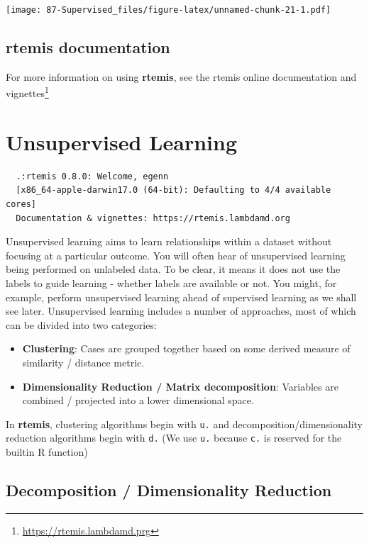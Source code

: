 \documentclass[
]{book}
\providecommand{\tightlist}{%
  \setlength{\itemsep}{0pt}\setlength{\parskip}{0pt}}
\renewcommand{\href}[2]{#2\footnote{\url{#1}}}
\begin{document}
\texttt{[image: 87-Supervised\_files/figure-latex/unnamed-chunk-21-1.pdf]}

\hypertarget{rtemis-documentation}{%
\section{\texorpdfstring{\textbf{rtemis} documentation}{rtemis documentation}}\label{rtemis-documentation}}

For more information on using \textbf{rtemis}, see the \href{https://rtemis.lambdamd.prg}{rtemis online documentation and vignettes}

\hypertarget{unsupervised}{%
\chapter{Unsupervised Learning}\label{unsupervised}}

\begin{verbatim}
  .:rtemis 0.8.0: Welcome, egenn
  [x86_64-apple-darwin17.0 (64-bit): Defaulting to 4/4 available cores]
  Documentation & vignettes: https://rtemis.lambdamd.org
\end{verbatim}

Unsupervised learning aims to learn relationships within a dataset without focusing at a particular outcome. You will often hear of unsupervised learning being performed on unlabeled data. To be clear, it means it does not use the labels to guide learning - whether labels are available or not. You might, for example, perform unsupervised learning ahead of supervised learning as we shall see later. Unsupervised learning includes a number of approaches, most of which can be divided into two categories:

\begin{itemize}
\tightlist
\item
  \textbf{Clustering}: Cases are grouped together based on some derived measure of similarity / distance metric.
\item
  \textbf{Dimensionality Reduction / Matrix decomposition}: Variables are combined / projected into a lower dimensional space.
\end{itemize}

In \textbf{rtemis}, clustering algorithms begin with \texttt{u.} and decomposition/dimensionality reduction algorithms begin with \texttt{d.} (We use \texttt{u.} because \texttt{c.} is reserved for the builtin R function)

\hypertarget{decomposition}{%
\section{Decomposition / Dimensionality Reduction}\label{decomposition}}
\end{document}
